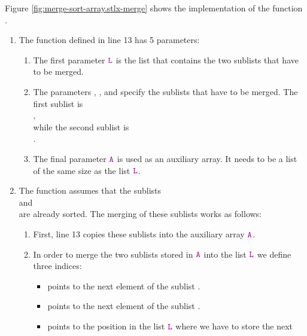 Figure \ref{fig:merge-sort-array.stlx-merge} shows the implementation of the function .
\begin{enumerate}
\item The function  defined in line 13 has 5 parameters: 
      \begin{enumerate}
      \item The first parameter $\mytt{L}$ is the list that contains the two sublists that have to be merged.
      \item The parameters , , and  specify the sublists
            that have to be merged.  The first sublist is 
            \\[0.2cm]
            \hspace*{1.3cm} 
            , 
            \\[0.2cm]
            while the second sublist is \\[0.2cm]
            \hspace*{1.3cm} 
            . 
      \item The final parameter $\mytt{A}$ is used as an auxiliary array.  It needs to be a list of the
            same size as the list $\mytt{L}$.
      \end{enumerate}
\item The function  assumes that the sublists 
      \\[0.2cm]
      \hspace*{1.3cm}
       \quad and \quad {} 
      \\[0.2cm]
      are already sorted.  The merging of these sublists works as follows:
      \begin{enumerate}
      \item First, line 13 copies these sublists into the auxiliary array $\mytt{A}$.
      \item In order to merge the two sublists stored in $\mytt{A}$ into the list $\mytt{L}$ we define
            three indices: 
            \begin{itemize}
            \item {} points to the next element of the sublist .
            \item {} points to the next element of the sublist .
            \item {} points to the position in the list $\mytt{L}$ where we have to store the next

\end{itemize}
\end{enumerate}
\end{enumerate}
